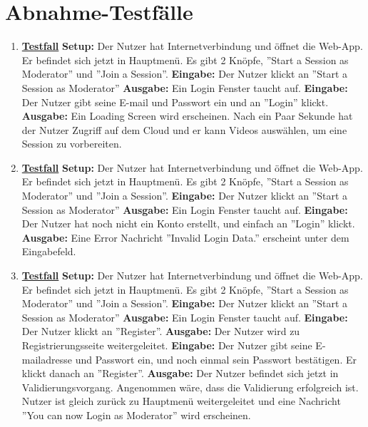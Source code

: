 \section{Abnahme-Testfälle}
\begin{enumerate}
	\item \underline{\textbf{Testfall}} \linebreak
	\textbf{Setup:} Der Nutzer hat Internetverbindung und öffnet die Web-App. Er befindet sich jetzt in Hauptmenü. Es gibt 2 Knöpfe, ''Start a Session as Moderator'' und ''Join a Session''.\linebreak
	\textbf{Eingabe:} Der Nutzer klickt an ''Start a Session as Moderator''\linebreak
	\textbf{Ausgabe:} Ein Login Fenster taucht auf.\linebreak
	\textbf{Eingabe:} Der Nutzer gibt seine E-mail und Passwort ein und an ''Login'' klickt.\linebreak
	\textbf{Ausgabe:} Ein Loading Screen wird erscheinen. Nach ein Paar Sekunde hat der Nutzer Zugriff auf dem Cloud und er kann Videos auswählen, um eine Session zu vorbereiten.
	
	\item \underline{\textbf{Testfall}} \linebreak
	\textbf{Setup:} Der Nutzer hat Internetverbindung und öffnet die Web-App. Er befindet sich jetzt in Hauptmenü. Es gibt 2 Knöpfe, ''Start a Session as Moderator'' und ''Join a Session''. \linebreak
	\textbf{Eingabe:} Der Nutzer klickt an ''Start a Session as Moderator'' \linebreak
	\textbf{Ausgabe:} Ein Login Fenster taucht auf.\linebreak
	\textbf{Eingabe:} Der Nutzer hat noch nicht ein Konto erstellt, und einfach an ''Login'' klickt.\linebreak
	\textbf{Ausgabe:} Eine Error Nachricht ''Invalid Login Data.'' erscheint unter dem Eingabefeld.
	
	\item \underline{\textbf{Testfall}} \linebreak
	\textbf{Setup:} Der Nutzer hat Internetverbindung und öffnet die Web-App. Er befindet sich jetzt in Hauptmenü. Es gibt 2 Knöpfe, ''Start a Session as Moderator'' und ''Join a Session''.\linebreak
	\textbf{Eingabe:} Der Nutzer klickt an ''Start a Session as Moderator'' \linebreak
	\textbf{Ausgabe:} Ein Login Fenster taucht auf.\linebreak
	\textbf{Eingabe:} Der Nutzer klickt an ''Register''.\linebreak
	\textbf{Ausgabe:} Der Nutzer wird zu Registrierungsseite weitergeleitet.\linebreak
	\textbf{Eingabe:} Der Nutzer gibt seine E-mailadresse und Passwort ein, und noch einmal sein Passwort bestätigen. Er klickt danach an ''Register''. \linebreak
	\textbf{Ausgabe:} Der Nutzer befindet sich jetzt in Validierungsvorgang. Angenommen wäre, dass die Validierung erfolgreich ist. Nutzer ist gleich zurück zu Hauptmenü weitergeleitet und eine Nachricht ''You can now Login as Moderator'' wird erscheinen.
	

\end{enumerate}

